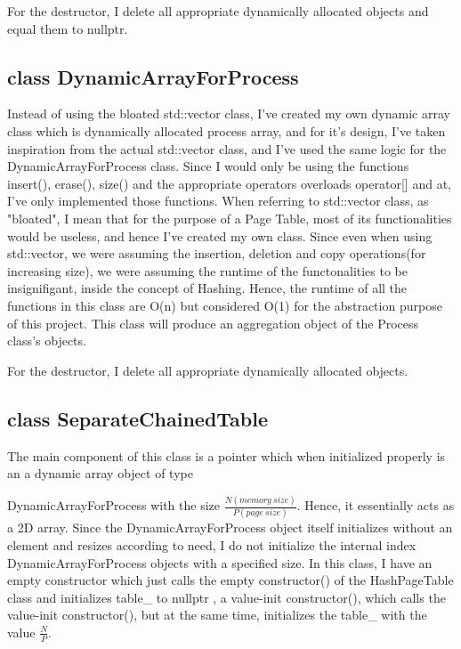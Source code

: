 \documentclass[a4paper]{article}
\begin{document}
    For the destructor, I delete all appropriate dynamically allocated objects and equal them to {\color{LightPink}nullptr}.

    \subsection{{\color{orange}class} {\color{draculapurple}DynamicArrayForProcess}}
    Instead of using the bloated {\color{draculapurple}std::vector} class, I've created my own dynamic array class
    which is dynamically allocated process array, and for it's design, I've taken inspiration from the actual
        {\color{draculapurple}std::vector} class, and I've used the same logic for the {\color{draculapurple}DynamicArrayForProcess} class.
    Since I would only be using the functions {\color{draculapurple}insert()}, {\color{draculapurple}erase()},
        {\color{draculapurple}size()} and the appropriate operators overloads {\color{draculapurple}operator[]} and {\color{draculapurple}at},
    I've only implemented those functions. When referring to {\color{draculapurple}std::vector} class, as "bloated", I mean that
    for the purpose of a Page Table, most of its functionalities would be useless, and hence I've created my own class.
    Since even when using {\color{draculapurple}std::vector}, we were assuming the insertion, deletion and copy
    operations(for increasing size), we were assuming the runtime of the functonalities to be insignifigant, inside the concept of Hashing.
    Hence, the runtime of all the functions in this class are {\color{lightblue}O(n)} but considered {\color{lightblue}O(1)} for the
    abstraction purpose of this project. This class will produce an aggregation object of the {\color{draculapurple}Process} class's objects.

    For the destructor, I delete all appropriate dynamically allocated objects.

    \subsection{{\color{orange}class} {\color{draculapurple}SeparateChainedTable}}

    The main component of this class is a pointer which when initialized properly is an a dynamic array object of type

        {\color{draculapurple}DynamicArrayForProcess} with the size {\color{lightblue}$\frac{N(memory\ size)}{P(page\ size)}$}. Hence, it essentially acts as a 2D array.
    Since the {\color{draculapurple}DynamicArrayForProcess} object itself initializes without an element and resizes
    according to need, I do not initialize the internal index {\color{draculapurple}DynamicArrayForProcess} objects with a specified size.
    In this class, I have an empty constructor which just calls the empty {\color{draculapurple}constructor()} of the {\color{draculapurple}HashPageTable} class and
    initializes {\color{Turquoise}table\_} to {\color{LightPink}nullptr} , a value-init {\color{draculapurple}constructor()},
    which calls the value-init {\color{draculapurple}constructor()}, but at the same time, initializes the {\color{Turquoise}table\_} with the value
        {\color{lightblue}$\frac{N}{P}$}.
\end{document}
